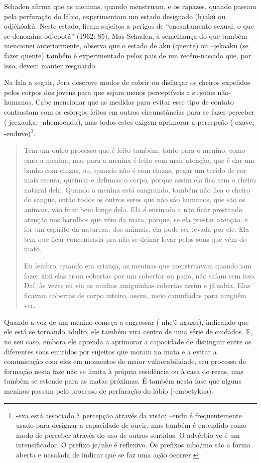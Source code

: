 Schaden afirma que as meninas, quando menstruam, e os rapazes, quando
passam pela perfuração do lábio, experimentam um estado designado
(h)akú ou odjékóakú. Neste estado, ficam sujeitos a perigos de
``encantamento sexual, o que se denomina odjepotá'' (1962: 85). Mas
Schaden, à semelhança do que também mencionei anteriormente, observa
que o estado de aku (quente) ou –jekoaku (se fazer quente) também é
experimentado pelos pais de um recém-nascido que, por isso, devem
manter resguardo. 

Na fala a seguir, Jera descreve modos de cobrir ou disfarçar os cheiros
expelidos pelos corpos dos jovens para que sejam menos perceptíveis a
sujeitos não-humanos. Cabe mencionar que as medidas para evitar esse
tipo de contato contrastam com os esforços feitos em outras
circunstâncias para se fazer perceber (-jeexauka; -nhemoendu), mas
todos estes exigem aprimorar a percepção (-exave;
-enduve)\footnote{{}-exa está associado à percepção através da visão;
–endu é frequentemente usado para designar a capacidade de ouvir, mas
também é entendido como modo de perceber através do uso de outros
sentidos. O advérbio ve é um intensificador. O prefixo je/nhe é
reflexivo. Os prefixos mbo/mo são a forma aberta e nasalada de indicar
que se faz uma ação ocorrer. }. 

\begin{quotation}
Tem um outro processo que é feito também, tanto para o menino, como para
a menina, mas para a menina é feito com mais atenção, que é dar um
banho com cinzas, ou, quando não é com cinzas, pegar um tecido de cor
mais escura, queimar e defumar o corpo, porque assim ela fica sem o
cheiro natural dela. Quando a menina está sangrando, também não fica o
cheiro do sangue, então todos os outros seres que não são humanos, que
são os animais, vão ficar bem longe dela. Ela é ensinada a não ficar
prestando atenção nos barulhos que vêm da mata, porque, se ela prestar
atenção, e for um espírito da natureza, dos animais, ela pode ser
levada por ele. Ela tem que ficar concentrada pra não se deixar levar
pelos sons que vêm do mato.

Eu lembro, quando era criança, as meninas que menstruavam quando iam
fazer xixi elas eram cobertas por um cobertor ou pano, não saíam sem
isso. Daí, às vezes eu via as minhas amiguinhas cobertas assim e já
sabia. Elas ficavam cobertas de corpo inteiro, assim, meio camufladas
para ninguém ver.
\end{quotation}

Quando a voz de um menino começa a engrossar
(-nhe'\~{e} nguxu), indicando que ele está se
tornando adulto, ele também vira centro de uma série de cuidados. E, no
seu caso, embora ele aprenda a aprimorar a capacidade de distinguir
entre os diferentes sons emitidos por sujeitos que moram na mata e a
evitar a comunicação com eles em momentos de maior vulnerabilidade, seu
processo de formação nesta fase não se limita à própria residência ou à
casa de rezas, mas também se estende para as matas próximas. É também
nesta fase que alguns meninos passam pelo processo de perfuração do
lábio (-embetykua). 

